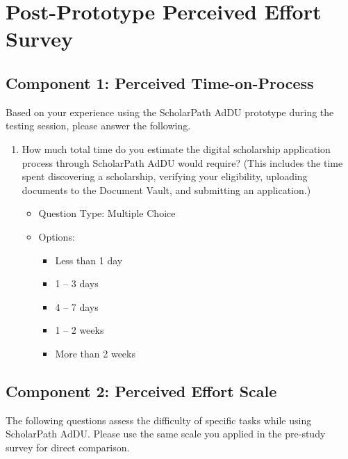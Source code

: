 \chapter{Post-Prototype Perceived Effort Survey}
\label{app:post-survey}

\section{Component 1: Perceived Time-on-Process}

Based on your experience using the ScholarPath AdDU prototype during the testing session, please answer the following.

\begin{enumerate}[series=q, label={Question \arabic*:}, leftmargin=*, align=left]
  \item How much total time do you estimate the digital scholarship application process through ScholarPath AdDU would require? (This includes the time spent discovering a scholarship, verifying your eligibility, uploading documents to the Document Vault, and submitting an application.)
  \begin{itemize}[leftmargin=*]
    \item Question Type: Multiple Choice
    \item Options:
    \begin{itemize}[leftmargin=*]
      \item Less than 1 day
      \item 1 -- 3 days
      \item 4 -- 7 days
      \item 1 -- 2 weeks
      \item More than 2 weeks
    \end{itemize}
  \end{itemize}
\end{enumerate}

\section{Component 2: Perceived Effort Scale}

The following questions assess the difficulty of specific tasks while using ScholarPath AdDU. Please use the same scale you applied in the pre-study survey for direct comparison.

